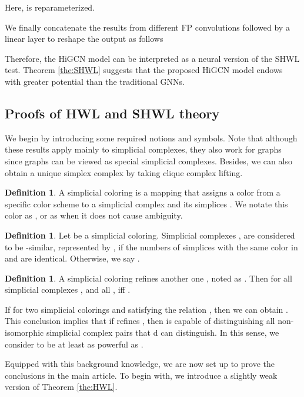 \documentclass[letterpaper]{article} \usepackage{aaai24}
\theoremstyle{plain}
\theoremstyle{definition}
\newtheorem{definition}[theorem]{Definition}
\theoremstyle{remark}
\begin{document}
Here,  is reparameterized. 

We finally concatenate the results from different FP convolutions followed by a linear layer to reshape the output as follows


Therefore, the HiGCN model can  be interpreted as a neural version of the SHWL test. Theorem \ref{the:SHWL} suggests that the proposed HiGCN model endows with greater potential than the traditional GNNs.

\subsection{Proofs of HWL and SHWL theory}
\label{appendix: proofs_HWL_SHWL}

We begin by introducing some required notions and symbols. Note that although these results apply mainly to simplicial complexes, they also work for graphs since graphs can be viewed as special simplicial complexes. Besides, we can also obtain a unique simplex complex by taking clique complex lifting. 




\begin{definition}
A simplicial coloring  is a mapping that assigns a color from a specific color scheme to a simplicial complex  and its simplices . We notate this color as , or as  when it does not cause ambiguity.
\end{definition}



\begin{definition}
Let  be a simplicial coloring. Simplicial complexes ,  are considered to be -similar, represented by , if the numbers of simplices with the same color in  and  are identical. Otherwise, we say .
\end{definition}

\begin{definition}
A simplicial coloring  refines another one , noted as . Then for all simplicial complexes ,  and all ,  iff .
\end{definition}

If  for two simplicial colorings  and  satisfying the relation , then we can obtain  \cite{SWL2021}. This conclusion implies that if  refines , then  is capable of distinguishing all non-isomorphic simplicial complex pairs that d can distinguish. In this sense, we consider  to be at least as powerful as .

Equipped with this background knowledge, we are now set up to prove the conclusions in the main article. To begin with, we introduce a slightly weak version of Theorem \ref{the:HWL}.
\end{document}
